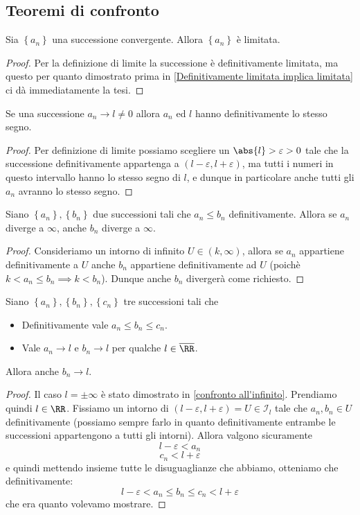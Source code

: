 \documentclass[11pt]{scrartcl}
\begin{document}
	\subsection{Teoremi di confronto}
	\begin{proposition}
		Sia $\left\{a_n\right\}$ una successione convergente. Allora $\left\{a_n\right\}$ è limitata.
	\end{proposition}
	\begin{proof}
		Per la definizione di limite la successione è definitivamente limitata, ma questo per quanto dimostrato prima in \ref{Definitivamente limitata implica limitata} ci dà immediatamente la tesi.
	\end{proof}
	\begin{theorem}\label{Permanenze del segno}
		Se una successione $a_n\to l\ne 0 $ allora $a_n$ ed $l$ hanno definitivamente lo stesso segno. 
	\end{theorem}
	\begin{proof}
		Per definizione di limite possiamo scegliere un $\abs{l}>\varepsilon>0$ tale che la successione definitivamente appartenga a $(l-\varepsilon,l+\varepsilon)$, ma tutti i numeri in questo intervallo hanno lo stesso segno di $l$, e dunque in particolare anche tutti gli $a_n$ avranno lo stesso segno.
	\end{proof}
	\begin{proposition}\label{confronto all'infinito}
		Siano $\left\{a_n\right\},\left\{b_n\right\}$ due successioni tali che $a_n\le b_n$ definitivamente. Allora se $a_n$ diverge a $\infty$, anche $b_n$ diverge a $\infty$.
	\end{proposition}
	\begin{proof}
		Consideriamo un intorno di infinito $U\in(k,\infty)$, allora se $a_n$ appartiene definitivamente a $U$ anche $b_n$ appartiene definitivamente ad $U$ (poichè $k<a_n\le b_n \implies k<b_n$). Dunque anche $b_n$ divergerà come richiesto.
	\end{proof}
	\begin{theorem}\label{carabinieri}
		Siano $\left\{a_n\right\},\left\{b_n\right\},\left\{c_n\right\}$ tre successioni tali che
		\begin{itemize}
			\item Definitivamente vale $a_n\le b_n \le c_n$.
			\item Vale $a_n\to l$ e $b_n\to l$ per qualche $l\in\overline{\RR}$.
		\end{itemize}
		Allora anche $b_n\to l$. 
	\end{theorem}
	\begin{proof}
		Il caso $l=\pm\infty$ è stato dimostrato in \ref{confronto all'infinito}. Prendiamo quindi $l\in\RR$.
		Fissiamo un intorno di $(l-\varepsilon,l+\varepsilon)=U\in\mathcal{I}_l$ tale che $a_n,b_n\in U$ definitivamente (possiamo sempre farlo in quanto definitivamente entrambe le successioni appartengono a tutti gli intorni). Allora valgono sicuramente
		$$l-\varepsilon < a_n$$
		$$c_n < l+\varepsilon$$
		e quindi mettendo insieme tutte le disuguaglianze che abbiamo, otteniamo che definitivamente:
		$$l-\varepsilon < a_n \le b_n \le c_n < l+\varepsilon$$
		che era quanto volevamo mostrare.
	\end{proof}
\end{document}
